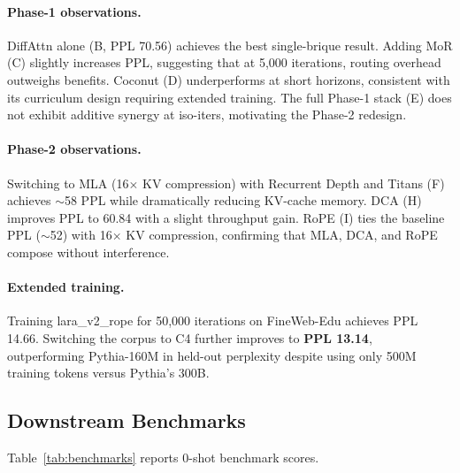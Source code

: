 \documentclass{article}
\begin{document}
\paragraph{Phase-1 observations.}
DiffAttn alone (B, PPL 70.56) achieves the best single-brique result. Adding MoR (C) slightly increases PPL, suggesting that at 5{,}000 iterations, routing overhead outweighs benefits. Coconut (D) underperforms at short horizons, consistent with its curriculum design requiring extended training. The full Phase-1 stack (E) does not exhibit additive synergy at iso-iters, motivating the Phase-2 redesign.

\paragraph{Phase-2 observations.}
Switching to MLA (16$\times$ KV compression) with Recurrent Depth and Titans (F) achieves $\sim$58 PPL while dramatically reducing KV-cache memory. DCA (H) improves PPL to 60.84 with a slight throughput gain. RoPE (I) ties the baseline PPL ($\sim$52) with 16$\times$ KV compression, confirming that MLA, DCA, and RoPE compose without interference.

\paragraph{Extended training.}
Training lara\_v2\_rope for 50{,}000 iterations on FineWeb-Edu achieves PPL 14.66. Switching the corpus to C4 further improves to \textbf{PPL 13.14}, outperforming Pythia-160M \citep{biderman2023pythia} in held-out perplexity despite using only 500M training tokens versus Pythia's 300B.

\subsection{Downstream Benchmarks}

Table~\ref{tab:benchmarks} reports 0-shot benchmark scores.
\end{document}
